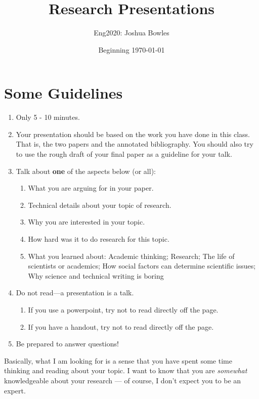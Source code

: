 \documentclass[11pt]{article}
\author{Eng2020: Joshua Bowles}
\title{Research Presentations}
\date{Beginning \today}
\begin{document}
\maketitle



\section{Some Guidelines}
\begin{enumerate}
\item Only 5 - 10 minutes.

\item  Your presentation should be based on the work you have done in this class. That is, the two papers and the annotated bibliography. You should also try to use the rough draft of your final paper as a guideline for your talk.

 \item  Talk about {\bf one} of the aspects below (or all):
    \begin{enumerate}
\item What you are arguing for in your paper.
 \item Technical details about your topic of research.
 \item Why you are interested in your topic.
 \item How hard was it to do research for this topic.
 \item What you learned about: Academic thinking; Research; The life of scientists or academics; How social factors can determine scientific issues; Why science and technical writing is boring
    \end{enumerate}
\item  Do not read---a presentation is a talk. 
    \begin{enumerate}
\item If you use a powerpoint, try not to read directly off the page.
\item If you have a handout, try not to read directly off the page.
    \end{enumerate}
\item  Be prepared to answer questions!
\end{enumerate}
Basically, what I am looking for is a sense that you have spent some time thinking and reading about your topic. I want to know that you are \textsl{somewhat} knowledgeable about your research --- of course, I don't expect you to be an expert. 


 
\end{document}
